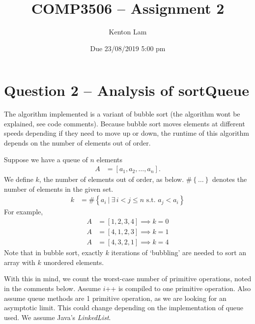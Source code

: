 \documentclass[11pt,a4paper]{article} %
\author{Kenton Lam}
\date{{Due 23/08/2019 5:00 pm}}
\title{COMP3506 -- Assignment 2}
\begin{document}
%

\setcounter{page}{1}
\maketitle
\section*{Question 2 -- {Analysis of {sortQueue}}}

The algorithm implemented is a variant of bubble sort (the algorithm wont be
explained, see code comments). Because bubble sort moves elements at different speeds
depending if they need to move up or down, 
the runtime of this algorithm depends on the number
of elements out of order. 

Suppose we have a queue of $n$ elements
\begin{align*}
    A &= \left[ a_1, a_2, \ldots, a_n \right].
\end{align*}
We define $k$, the number of elements 
out of order, as below. $\# \left\{ \ldots\right\}$ denotes the number of elements in the given set.
\begin{align*}
    k &= \# \left\{a_i ~|~ \exists\, i < j \le n \text{ s.t. } a_j < a_i\right\}
\end{align*}
For example, 
\begin{align*}
    A &= \left[ 1, 2, 3, 4 \right] \implies k = 0 \\ 
    A &= \left[ 4, 1, 2, 3 \right] \implies k = 1 \\ 
    A &= \left[ 4, 3, 2, 1 \right] \implies k = 4
\end{align*}
Note that in bubble sort, exactly $k$ iterations of `bubbling' are needed to sort
an array with $k$ unordered elements.

With this in mind, we count the worst-case number of primitive operations,
noted in the comments below. Assume $i$++ is compiled to one primitive operation.
Also assume queue methods are 1 primitive operation, as we are looking for an asymptotic 
limit. This could change depending 
on the implementation of queue used. We assume Java's \textit{LinkedList}.
\end{document}
